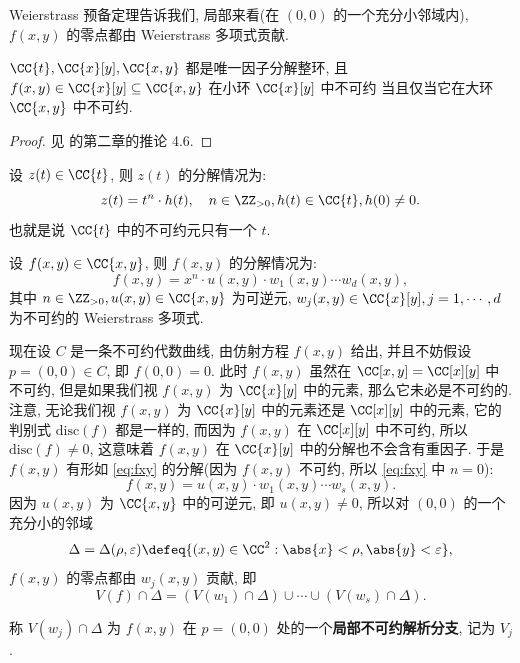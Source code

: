 Weierstrass 预备定理告诉我们, 局部来看(在 $(0,0)$ 的一个充分小邻域内),
$f(x,y)$ 的零点都由 Weierstrass 多项式贡献.

\begin{thm}
\label{thm:UFD}
$\CC\{t\}, \CC\{x\}[y], \CC\{x,y\}$ 都是唯一因子分解整环,
且 $f(x,y) \in \CC\{x\}[y] \subseteq \CC\{x,y\}$ 在小环 $\CC\{x\}[y]$ 中不可约
当且仅当它在大环 $\CC\{x,y\}$ 中不可约.
\end{thm}

\begin{proof}
见 \cite{textbook} 的第二章的推论 4.6.
\end{proof}

设 $z(t) \in \CC\{t\}$, 则 $z(t)$ 的分解情况为:
\begin{equation}
\label{eq:zt}
    z(t) = t^n\cdot h(t), \quad n \in \ZZ_{>0}, h(t) \in \CC\{t\}, h(0) \ne 0.
\end{equation}
也就是说 $\CC\{t\}$ 中的不可约元只有一个 $t$.

设 $f(x,y) \in \CC\{x,y\}$, 则 $f(x,y)$ 的分解情况为:
\begin{equation}
\label{eq:fxy}
    f(x,y) = x^n\cdot u(x,y)\cdot w_1(x,y)\cdots w_d(x,y),
\end{equation}
其中 $n \in \ZZ_{>0}, u(x,y) \in \CC\{x,y\}$ 为可逆元,
$w_j(x,y) \in \CC\{x\}[y], j = 1,\cdots, d$ 为不可约的 Weierstrass 多项式.

现在设 $C$ 是一条不可约代数曲线, 由仿射方程 $f(x,y)$ 给出,
并且不妨假设 $p = (0,0) \in C$, 即 $f(0,0) = 0$.
此时 $f(x,y)$ 虽然在 $\CC[x,y] = \CC[x][y]$ 中不可约,
但是如果我们视 $f(x,y)$ 为 $\CC\{x\}[y]$ 中的元素, 那么它未必是不可约的.
注意, 无论我们视 $f(x,y)$ 为 $\CC\{x\}[y]$ 中的元素还是 $\CC[x][y]$ 中的元素,
它的判别式 $\mathrm{disc}(f)$ 都是一样的,
而因为 $f(x,y)$ 在 $\CC[x][y]$ 中不可约, 所以 $\mathrm{disc}(f) \ne 0$,
这意味着 $f(x,y)$ 在 $\CC\{x\}[y]$ 中的分解也不会含有重因子.
于是 $f(x,y)$ 有形如 \cref{eq:fxy} 的分解(因为
$f(x,y)$ 不可约, 所以 \cref{eq:fxy} 中 $n = 0$):
\begin{equation}
\label{eq:analytic-decomposition}
f(x,y) = u(x,y)\cdot w_1(x,y)\cdots w_s(x,y).
\end{equation}
因为 $u(x,y)$ 为 $\CC\{x,y\}$ 中的可逆元, 即 $u(x,y) \ne 0$,
所以对 $(0,0)$ 的一个充分小的邻域
\[\Delta = \Delta(\rho,\varepsilon) \defeq\{(x,y) \in \CC^2: \abs{x} < \rho, \abs{y} < \varepsilon\},\]
$f(x,y)$ 的零点都由 $w_j(x,y)$ 贡献, 即
\[V(f) \cap \Delta = (V(w_1)\cap \Delta)\cup \cdots \cup (V(w_s)\cap \Delta).\]

\begin{defin}[局部不可约解析分支]
\label{defin:local-irre-component}
称 $V(w_j)\cap \Delta$ 为 $f(x,y)$ 在 $p = (0,0)$ 处的一个\textbf{局部不可约解析分支},
记为 $V_j$.
\end{defin}

